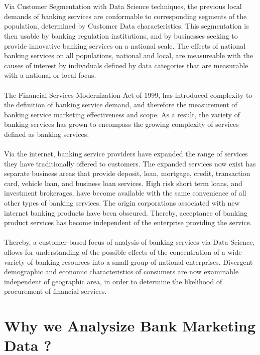 \\
\\
Via Customer Segmentation with Data Science techniques, the previous local demands of banking services are conformable to corresponding segments of the population, determined by Customer Data characteristics. This segmentation is then usable by banking regulation institutions, and by businesses seeking to provide innovative banking services on a national scale. The effects of national banking services on all populations, national and local, are measureable with the causes of interest by individuals defined by data categories that are measurable with a national or local focus.
\\
\\
The Financial Services Modernization Act of 1999, has introduced complexity to the definition of banking service demand, and therefore the measurement of banking service marketing effectiveness and scope. As a result, the variety of banking services has grown to encompass the growing complexity of services defined as banking services.
\\
\\
Via the internet, banking service providers have expanded the range of services they have traditionally offered to customers. The expanded services now exist has separate business areas that provide deposit, loan, mortgage, credit, transaction card, vehicle loan, and business loan services. High risk short term loans, and investment brokerages, have become available with the same convenience of all other types of banking services. The origin corporations associated with new internet banking products have been obscured. Thereby, acceptance of banking product services has become independent of the enterprise providing the service.
\\
\\
Thereby, a customer-based focus of analysis of banking services via Data Science, allows for understanding of the possible effects of the concentration of a wide variety of banking resources into a small group of national enterprises. Divergent demographic and economic characteristics of consumers are now examinable independent of geographic area, in order to determine the likelihood of procurement of financial services.
\section{Why we Analysize Bank Marketing Data ?}

